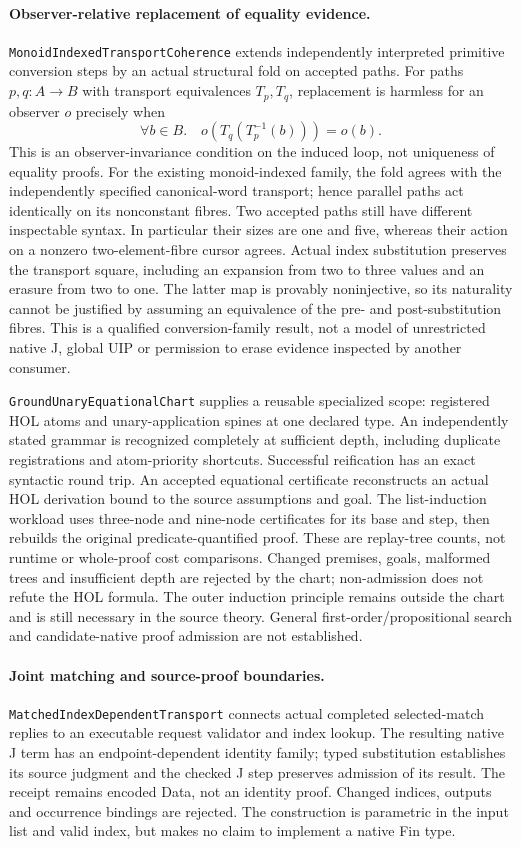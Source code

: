 \documentclass[11pt]{article}
\theoremstyle{definition}
\theoremstyle{remark}
\begin{document}
\paragraph{Observer-relative replacement of equality evidence.}
\texttt{MonoidIndexedTransportCoherence} extends independently interpreted
primitive conversion steps by an actual structural fold on accepted paths.
For paths $p,q:A\to B$ with transport equivalences $T_p,T_q$, replacement
is harmless for an observer $o$ precisely when
\[
  \forall b\in B.\quad o(T_q(T_p^{-1}(b)))=o(b).
\]
This is an observer-invariance condition on the induced loop, not uniqueness
of equality proofs. For the existing monoid-indexed family, the fold agrees
with the independently specified canonical-word transport; hence parallel
paths act identically on its nonconstant fibres. Two accepted paths still
have different inspectable syntax. In particular their sizes are one and
five, whereas their action on a nonzero two-element-fibre cursor agrees.
Actual index substitution preserves the transport square, including an
expansion from two to three values and an erasure from two to one. The latter
map is provably noninjective, so its naturality cannot be justified by
assuming an equivalence of the pre- and post-substitution fibres. This is a
qualified conversion-family result, not a model of unrestricted native J,
global UIP or permission to erase evidence inspected by another consumer.

\texttt{GroundUnaryEquationalChart} supplies a reusable specialized scope:
registered HOL atoms and unary-application spines at one declared type.
An independently stated grammar is recognized completely at sufficient
depth, including duplicate registrations and atom-priority shortcuts.
Successful reification has an exact syntactic round trip. An accepted
equational certificate reconstructs an actual HOL derivation bound to the
source assumptions and goal. The list-induction workload uses three-node and
nine-node certificates for its base and step, then rebuilds the original
predicate-quantified proof. These are replay-tree counts, not runtime or
whole-proof cost comparisons. Changed premises, goals, malformed trees and
insufficient depth are rejected by the chart; non-admission does not refute
the HOL formula. The outer induction principle remains outside the chart and
is still necessary in the source theory. General first-order/propositional
search and candidate-native proof admission are not established.

\paragraph{Joint matching and source-proof boundaries.}
\texttt{MatchedIndexDependentTransport} connects actual completed
selected-match replies to an executable request validator and index lookup.
The resulting native J term has an endpoint-dependent identity family;
typed substitution establishes its source judgment and the checked J step
preserves admission of its result. The receipt remains encoded Data, not an
identity proof. Changed indices, outputs and occurrence bindings are rejected.
The construction is parametric in the input list and valid index, but makes
no claim to implement a native Fin type.
\end{document}
